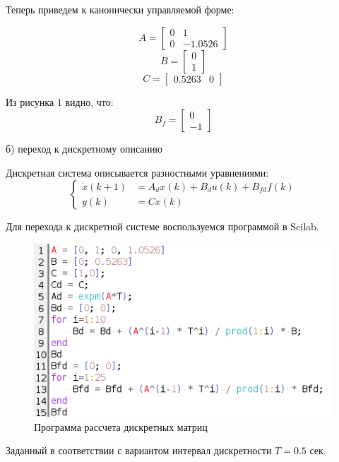 \documentclass[a4paper,14pt]{extreport}
\begin{document}
Теперь приведем к канонически управляемой форме:

\begin{equation}
A=
\begin{bmatrix}
0&1\\
0& -1.0526
\end{bmatrix}
\end{equation}
\begin{equation}
B=
\begin{bmatrix}
0\\
1
\end{bmatrix}
\end{equation}
\begin{equation}
C=
\begin{bmatrix}
0.5263&0
\end{bmatrix}
\end{equation}

Из рисунка 1 видно, что:
\begin{equation}
B_f=
\begin{bmatrix}
0\\
-1
\end{bmatrix}
\end{equation}

б) переход к дискретному описанию

Дискретная система описывается разностными уравнениями:
\begin{equation}
\begin{cases}
\dot x(k+1) &= A_d x(k) + B_d u(k) + B_{fd} f(k)\\
y(k) &= C x(k)
\end{cases}
\end{equation}

Для перехода к дискретной системе воспользуемся программой в Scilab.
	\begin{figure}[H]
	\center\includegraphics[width=0.5\linewidth]{pr.png}
	\caption{Программа рассчета дискретных матриц}
	\label{fig:scr1}
\end{figure}

Заданный в соответствии с вариантом интервал дискретности $T = 0.5$ сек.
\end{document}
